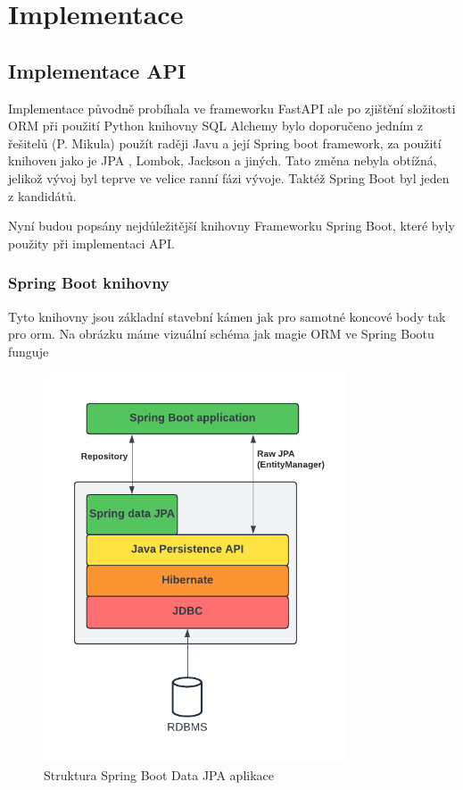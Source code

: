 \chapter{Implementace}

\section{Implementace API}
Implementace původně probíhala ve frameworku FastAPI  ale po zjištění složitosti ORM při použití Python knihovny SQL Alchemy bylo doporučeno jedním z řešitelů (P. Mikula)
použít raději Javu a její Spring boot framework, za použití knihoven jako je JPA , Lombok, Jackson a jiných. Tato změna nebyla obtížná, jelikož vývoj byl teprve ve velice ranní fázi vývoje. Taktéž Spring Boot byl jeden z kandidátů.

Nyní budou popsány nejdůležitější knihovny Frameworku Spring Boot, které byly použity při implementaci API.


\subsection{Spring Boot knihovny} %

Tyto knihovny jsou základní stavební kámen jak pro samotné koncové body tak pro \gls{orm}. Na obrázku  máme vizuální schéma jak magie ORM ve Spring Bootu funguje

\begin{figure}[ht!]
    \centering
    \includegraphics[width=0.8\textwidth]{figures/impl/API Implementation - JPA.pdf}
    \caption{Struktura Spring Boot Data JPA aplikace}
    \label{fig:JPA}
\end{figure}

